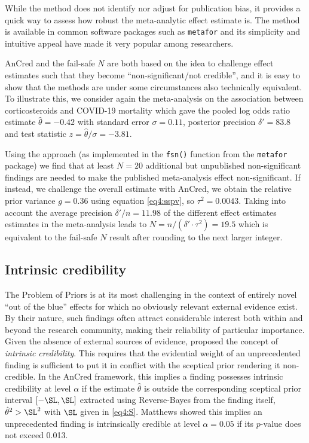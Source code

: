 While the method does not identify nor adjust for publication bias, it provides
a quick way to assess how robust the meta-analytic effect estimate is. The
method is available in common software packages such as \texttt{metafor}
\citep{Viechtbauer2010} and its simplicity and intuitive appeal have made it
very popular among researchers.



AnCred and the fail-safe $N$ are both based on the idea to challenge effect
estimates such that they become ``non-significant/not credible'', and it is easy
to show that the methods are under some circumstances also technically
equivalent. To illustrate this, we consider again the meta-analysis on the
association between corticosteroids and COVID-19 mortality \citep{REACT2020}
which gave the pooled log odds ratio estimate $\hat \theta = -0.42$ with
standard error $\sigma = 0.11$, posterior precision $\delta'=83.8$ and test
statistic $z=\hat \theta/\sigma= -3.81$.


Using the \citet{Rosenberg2005} approach (as implemented in the \texttt{fsn()}
function from the \texttt{metafor} package) we find that at least $N = 20$
additional but unpublished non-significant findings are needed to make the
published meta-analysis effect non-significant. If instead, we challenge the
overall estimate with AnCred, we obtain the relative prior variance $g = 0.36$
using equation \eqref{eq4:sspv}, so $\tau^2 = 0.0043$. Taking into account the
average precision $\delta' / n = 11.98$ of the different effect estimates
estimates in the meta-analysis leads to ${N} = n/(\delta' \cdot \tau^2) = 19.5$
which is equivalent to the fail-safe $N$ result after rounding to the next
larger integer.


\subsection{Intrinsic credibility}
\label{sec4:IC}

The Problem of Priors is at its most challenging in the context of entirely
novel ``out of the blue'' effects for which no obviously relevant external
evidence exist. By their nature, such findings often attract considerable
interest both within and beyond the research community, making their reliability
of particular importance. Given the absence of external sources of evidence,
\citet{Matthews2018} proposed the concept of \emph{intrinsic
  credibility}. This requires that the evidential weight of an unprecedented
finding is sufficient to put it in conflict with the sceptical prior rendering
it non-credible. In the AnCred framework, this implies a finding possesses
intrinsic credibility at level $\alpha$ if the estimate $\hat{\theta}$ is
outside the corresponding sceptical prior interval $[-\SL, \SL]$ extracted using
Reverse-Bayes from the finding itself, \ie $\hat{\theta}^2 > \SL^2$ with $\SL$
given in \eqref{eq4:S}. Matthews showed this implies an unprecedented finding is
intrinsically credible at level $\alpha=0.05$ if its $p$-value does not exceed
0.013.

